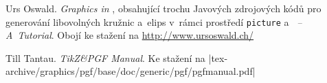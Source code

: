 \begin{thebibliography}{99}
 Urs Oswald.  
    \newblock \emph{Graphics in \LaTeXe{}}, obsahující trochu Javových zdrojových
    kódů pro generování libovolných kružnic a~elips v~rámci prostředí \texttt{picture}
    a~\emph{\MP{} -- A~Tutorial}.
  \newblock Obojí ke stažení na \url{http://www.ursoswald.ch/}

 Till Tantau.
  \newblock \emph{TikZ\&PGF Manual}. \newblock
  Ke stažení na \CTANalt|tex-archive/graphics/pgf/base/doc/generic/pgf/pgfmanual.pdf|
  
  

\end{thebibliography}


%

